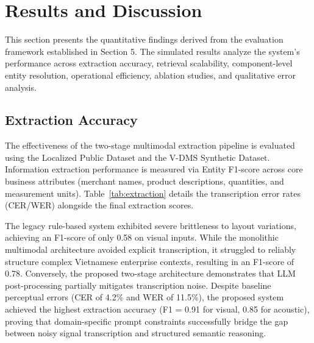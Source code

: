 \section{Results and Discussion}

This section presents the quantitative findings derived from the evaluation framework established in Section 5. The simulated results analyze the system's performance across extraction accuracy, retrieval scalability, component-level entity resolution, operational efficiency, ablation studies, and qualitative error analysis.

\subsection{Extraction Accuracy}
The effectiveness of the two-stage multimodal extraction pipeline is evaluated using the Localized Public Dataset and the V-DMS Synthetic Dataset. Information extraction performance is measured via Entity F1-score across core business attributes (merchant names, product descriptions, quantities, and measurement units). Table~\ref{tab:extraction} details the transcription error rates (CER/WER) alongside the final extraction scores.

The legacy rule-based system exhibited severe brittleness to layout variations, achieving an F1-score of only 0.58 on visual inputs. While the monolithic multimodal architecture avoided explicit transcription, it struggled to reliably structure complex Vietnamese enterprise contexts, resulting in an F1-score of 0.78. Conversely, the proposed two-stage architecture demonstrates that LLM post-processing partially mitigates transcription noise. Despite baseline perceptual errors (CER of 4.2\% and WER of 11.5\%), the proposed system achieved the highest extraction accuracy (F1 = 0.91 for visual, 0.85 for acoustic), proving that domain-specific prompt constraints successfully bridge the gap between noisy signal transcription and structured semantic reasoning.

